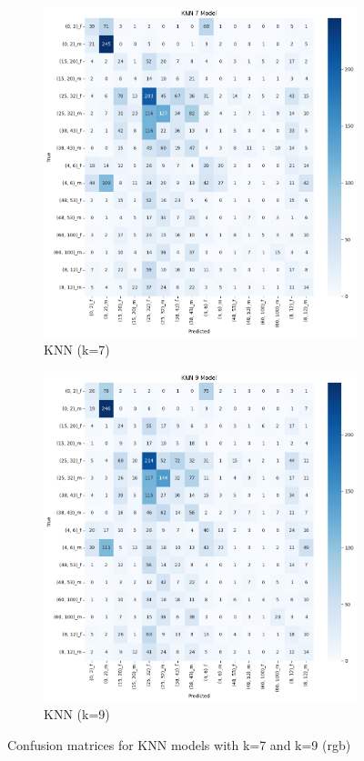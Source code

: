 \documentclass{article}
\begin{document}
\begin{figure}[H]
    \centering
    \begin{subfigure}[b]{0.48\textwidth}
        \includegraphics[width=\textwidth]{assets/confusion_matrix/rgb/KNN7.png}
        \caption{KNN (k=7)}
    \end{subfigure}
    \hfill
    \begin{subfigure}[b]{0.48\textwidth}
        \includegraphics[width=\textwidth]{assets/confusion_matrix/rgb/KNN9.png}
        \caption{KNN (k=9)}
    \end{subfigure}
    \caption{Confusion matrices for KNN models with k=7 and k=9 (rgb)}
    \label{fig:rgb_confusion_matrices_4}
\end{figure}
\end{document}
